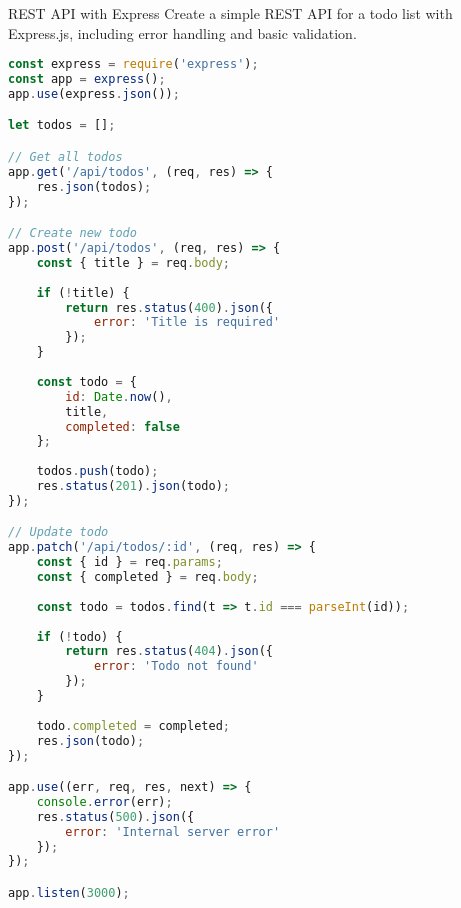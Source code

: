 \begin{example2}{REST API with Express}
Create a simple REST API for a todo list with Express.js, including error handling and basic validation.

\begin{lstlisting}[language=JavaScript, style=basesmol]
const express = require('express');
const app = express();
app.use(express.json());

let todos = [];

// Get all todos
app.get('/api/todos', (req, res) => {
    res.json(todos);
});

// Create new todo
app.post('/api/todos', (req, res) => {
    const { title } = req.body;
    
    if (!title) {
        return res.status(400).json({
            error: 'Title is required'
        });
    }
    
    const todo = {
        id: Date.now(),
        title,
        completed: false
    };
    
    todos.push(todo);
    res.status(201).json(todo);
});

// Update todo
app.patch('/api/todos/:id', (req, res) => {
    const { id } = req.params;
    const { completed } = req.body;
    
    const todo = todos.find(t => t.id === parseInt(id));
    
    if (!todo) {
        return res.status(404).json({
            error: 'Todo not found'
        });
    }
    
    todo.completed = completed;
    res.json(todo);
});

app.use((err, req, res, next) => {
    console.error(err);
    res.status(500).json({
        error: 'Internal server error'
    });
});

app.listen(3000);
\end{lstlisting}
\end{example2}

